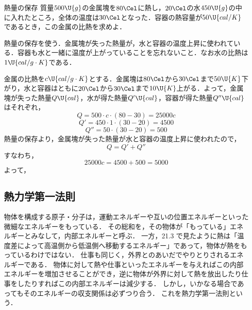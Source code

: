 \bsNeed{70mm}
\begin{reidaiunit}
\begin{reidai}{熱量の保存}
\hspace{1zw}質量$500\U{g}$の金属塊を$80\Cel$に熱し，$20\Cel$の水$450\U{g}$の中に入れたところ，全体の温度は$30\Cel$となった．容器の熱容量が$50\U{cal/K}$であるとき，この金属の比熱を求めよ．
\end{reidai}

\begin{sisinE}
熱量の保存を使う．金属塊が失った熱量が，水と容器の温度上昇に使われている．{\gtfamily 容器も水と一緒に温度が上がっている}ことを忘れないこと．なお水の比熱は$1\U{cal/g\cdot K}$である．
\end{sisinE}


\begin{kaitou}
\hspace{1zw}金属の比熱を$c\U{cal/g\cdot K}$とする．金属塊は$80\Cel$から$30\Cel$まで$50\U{K}$下がり，水と容器はともに$20\Cel$から$30\Cel$まで$10\U{K}$上がる．よって，金属塊が失った熱量$Q\U{cal}$，水が得た熱量$Q'\U{cal}$，容器が得た熱量$Q''\U{cal}$はそれぞれ，
\[Q=500\cdot c\cdot(80-30)=25000c\]
\[Q'=450\cdot 1\cdot(30-20)=4500\]
\[Q''=50\cdot(30-20)=500\]
\hspace{1zw}熱量の保存より，金属塊が失った熱量が水と容器の温度上昇に使われたので，
\[Q=Q'+Q''\]
すなわち，
\[25000c=4500+500=5000\]
よって，
\end{kaitou}
\end{reidaiunit}

\subsection{熱力学第一法則}

物体を構成する原子・分子は，運動エネルギーや互いの位置エネルギーといった微細なエネルギーをもっている．
{\gtfamily その総和を，その物体が「もっている」エネルギーとみなして，内部エネルギーと呼ぶ}．
一方，21.3 で見たように{\gtfamily 熱は「温度差によって高温側から低温側へ移動するエネルギー」}であって，物体が熱をもっているわけではない．
仕事も同じく，外界とのあいだでやりとりされるエネルギーである．
物体に対して熱や仕事といったエネルギーを与えればこの内部エネルギーを増加させることができ，逆に物体が外界に対して熱を放出したり仕事をしたりすればこの内部エネルギーは減少する．
しかし，いかなる場合であってもそのエネルギーの収支関係は必ずつり合う．
これを{\gtfamily 熱力学第一法則}という．

